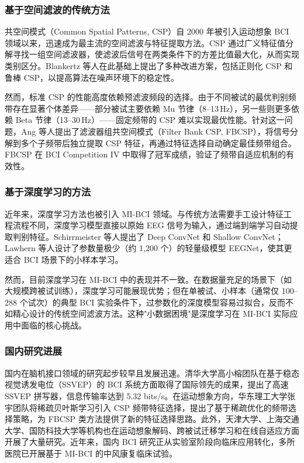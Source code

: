 \subsubsection{基于空间滤波的传统方法}

共空间模式（Common Spatial Patterns, CSP）自 2000 年被引入运动想象 BCI 领域以来，迅速成为最主流的空间滤波与特征提取方法。CSP 通过广义特征值分解寻找一组空间滤波器，使滤波后信号在两类条件下的方差比值最大化，从而实现类别区分。Blankertz 等人在此基础上提出了多种改进方案，包括正则化 CSP 和鲁棒 CSP，以提高算法在噪声环境下的稳定性。

然而，标准 CSP 的性能高度依赖预滤波频段的选择。由于不同被试的最优判别频带存在显著个体差异——部分被试主要依赖 Mu 节律（8--13\,Hz），另一些则更多依赖 Beta 节律（13--30\,Hz）——固定频带的 CSP 难以实现最优性能。针对这一问题，Ang 等人提出了滤波器组共空间模式（Filter Bank CSP, FBCSP），将信号分解到多个子频带后独立提取 CSP 特征，再通过特征选择自动确定最佳频带组合。FBCSP 在 BCI Competition IV 中取得了冠军成绩，验证了频带自适应机制的有效性。

\subsubsection{基于深度学习的方法}

近年来，深度学习方法也被引入 MI-BCI 领域。与传统方法需要手工设计特征工程流程不同，深度学习模型直接以原始 EEG 信号为输入，通过端到端学习自动提取判别特征。Schirrmeister 等人提出了 Deep ConvNet 和 Shallow ConvNet；Lawhern 等人设计了参数量极少（约 1,200 个）的轻量级模型 EEGNet，使其更适合 BCI 场景下的小样本学习。

然而，目前深度学习在 MI-BCI 中的表现并不一致。在数据量充足的场景下（如大规模跨被试训练），深度学习可能展现优势；但在单被试、小样本（通常仅 100--288 个试次）的典型 BCI 实验条件下，过参数化的深度模型容易过拟合，反而不如精心设计的传统空间滤波方法。这种"小数据困境"是深度学习在 MI-BCI 实际应用中面临的核心挑战。

\subsubsection{国内研究进展}

国内在脑机接口领域的研究起步较早且发展迅速。清华大学高小榕团队在基于稳态视觉诱发电位（SSVEP）的 BCI 系统方面取得了国际领先的成果，提出了高速 SSVEP 拼写器，信息传输率达到 5.32 bits/s。在运动想象方向，华东理工大学张宇团队将稀疏贝叶斯学习引入 CSP 频带特征选择，提出了基于稀疏优化的频带选择策略，为 FBCSP 类方法提供了新的特征选择思路。此外，天津大学、上海交通大学、国防科技大学等机构也在运动想象解码、跨被试迁移学习和在线自适应方面开展了大量研究。近年来，国内 BCI 研究正从实验室阶段向临床应用转化，多所医院已开展基于 MI-BCI 的中风康复临床试验。

